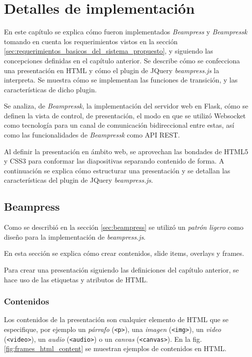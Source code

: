 \chapter{Detalles de implementación} %
\label{cha:detalles_de_implementacion}
	En este capítulo se explica cómo fueron implementados \textit{Beampress} y \textit{Beampressk} tomando en cuenta los requerimientos vistos en la sección \ref{sec:requerimientos_basicos_del_sistema_propuesto}, y siguiendo las concepciones definidas en el capítulo anterior. Se describe cómo se confecciona una presentación en HTML y cómo el plugin de JQuery \textit{beampress.js} la interpreta. Se muestra cómo se implementan las funciones de transición, y las características de dicho plugin.

	Se analiza, de \textit{Beampressk}, la implementación del servidor web en Flask, cómo se definen la vista de control, de presentación, el modo en que se utilizó Websocket como tecnología para un canal de comunicación bidireccional entre estas, así como las funcionalidades de \textit{Beampressk} como API REST.

	Al definir la presentación en ámbito web, se aprovechan las bondades de HTML5 y CSS3 para conformar las diapositivas separando contenido de forma. A continuación se explica cómo estructurar una presentación y se detallan las características del plugin de JQuery \textit{beampress.js}. 

	\section{Beampress} %
	\label{sec:beampress_imp}
	

		Como se describió en la sección \ref{sec:beampress} se utilizó un  \textit{patrón ligero} como diseño para la implementación de \textit{beampress.js}. 

		En esta sección se explica cómo crear contenidos, slide items, overlays y frames.

		Para crear una presentación siguiendo las definiciones del capítulo anterior, se hace uso de las etiquetas y atributos de HTML.


		\subsection{Contenidos} %
		\label{sub:contenidos}
			Los contenidos de la presentación son cualquier elemento de HTML que se especifique, por ejemplo un \textit{párrafo} (\texttt{<p>}), una \textit{imagen} (\texttt{<img>}), un \textit{video} (\texttt{<video>}), un \textit{audio} (\texttt{<audio>}) o un \textit{canvas} (\texttt{<canvas>}). En la fig. \ref{fig:frames_html_content} se muestran ejemplos de contenidos en HTML.

